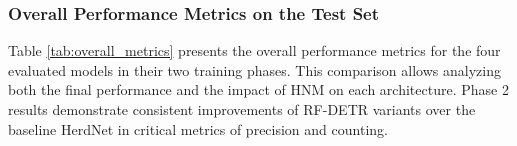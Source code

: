 \subsubsection{Overall Performance Metrics on the Test Set}
Table \ref{tab:overall_metrics} presents the overall performance metrics for the four evaluated models in their two training phases. This comparison allows analyzing both the final performance and the impact of HNM on each architecture. Phase 2 results demonstrate consistent improvements of RF-DETR variants over the baseline HerdNet in critical metrics of precision and counting.

\begin{table}[ht]
\centering
\caption{Overall performance metrics on the test set: comparison Phase 1 (initial training) vs Phase 2 (with Hard Negative Mining).}
\label{tab:overall_metrics}
\end{table}

